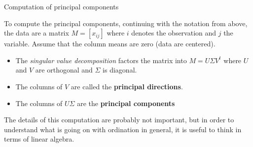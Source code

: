 \documentclass[
  ignorenonframetext,
]{beamer}
\providecommand{\tightlist}{%
  \setlength{\itemsep}{0pt}\setlength{\parskip}{0pt}}
\begin{document}
\begin{frame}{Computation of principal components}
\protect\hypertarget{computation-of-principal-components}{}

To compute the principal components, continuing with the notation from
above, the data are a matrix \(M=[x_{ij}]\) where \(i\) denotes the
observation and \(j\) the variable. Assume that the column means are
zero (data are centered).

\begin{itemize}
\tightlist
\item
  The \emph{singular value decomposition} factors the matrix into
  \(M=U\Sigma V^t\) where \(U\) and \(V\) are orthogonal and \(\Sigma\)
  is diagonal.
\item
  The columns of \(V\) are called the \textbf{principal directions}.
\item
  The columns of \(U\Sigma\) are the \textbf{principal components}
\end{itemize}

The details of this computation are probably not important, but in order
to understand what is going on with ordination in general, it is useful
to think in terms of linear algebra.

\end{frame}
\end{document}
